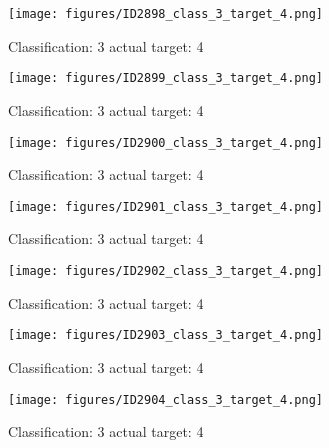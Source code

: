 \begin{figure}[h!]
\begin{center}
\texttt{[image: figures/ID2898\_class\_3\_target\_4.png]}
\end{center}
\caption{ Classification: 3 actual target: 4}
\label{fig:ID2898_class_3_target_4}
\end{figure}
\begin{figure}[h!]
\begin{center}
\texttt{[image: figures/ID2899\_class\_3\_target\_4.png]}
\end{center}
\caption{ Classification: 3 actual target: 4}
\label{fig:ID2899_class_3_target_4}
\end{figure}
\begin{figure}[h!]
\begin{center}
\texttt{[image: figures/ID2900\_class\_3\_target\_4.png]}
\end{center}
\caption{ Classification: 3 actual target: 4}
\label{fig:ID2900_class_3_target_4}
\end{figure}
\begin{figure}[h!]
\begin{center}
\texttt{[image: figures/ID2901\_class\_3\_target\_4.png]}
\end{center}
\caption{ Classification: 3 actual target: 4}
\label{fig:ID2901_class_3_target_4}
\end{figure}
\begin{figure}[h!]
\begin{center}
\texttt{[image: figures/ID2902\_class\_3\_target\_4.png]}
\end{center}
\caption{ Classification: 3 actual target: 4}
\label{fig:ID2902_class_3_target_4}
\end{figure}
\begin{figure}[h!]
\begin{center}
\texttt{[image: figures/ID2903\_class\_3\_target\_4.png]}
\end{center}
\caption{ Classification: 3 actual target: 4}
\label{fig:ID2903_class_3_target_4}
\end{figure}
\begin{figure}[h!]
\begin{center}
\texttt{[image: figures/ID2904\_class\_3\_target\_4.png]}
\end{center}
\caption{ Classification: 3 actual target: 4}
\label{fig:ID2904_class_3_target_4}
\end{figure}
